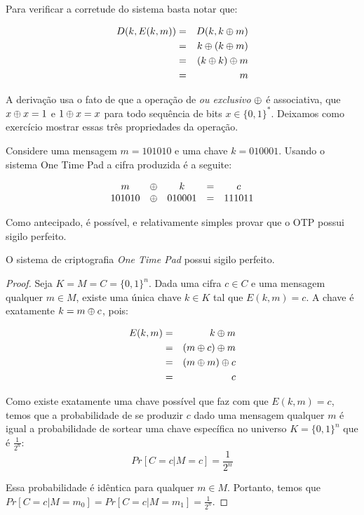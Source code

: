Para verificar a corretude do sistema basta notar que:

\begin{eqnarray*}
  D(k, E(k, m)) & = & D(k, k \oplus m)\\
                & = & k \oplus (k \oplus m)\\
                & = & (k \oplus k) \oplus m\\
                & = & m
\end{eqnarray*}

A derivação usa o fato de que a operação de {\em ou exclusivo} $\oplus$ é associativa, que $x \oplus x = 1$ e $1 \oplus x = x$ para todo sequência de bits $x \in \{0,1\}^*$.
Deixamos como exercício mostrar essas três propriedades da operação.

\begin{example}
  Considere uma mensagem $m = 101010$ e uma chave $k = 010001$.
Usando o sistema One Time Pad a cifra produzida é a seguite:

\begin{displaymath}
  \begin{array}{ccccc}
    m & \oplus & k & = & c \\
    101010 & \oplus & 010001 & = & 111011
  \end{array}
\end{displaymath}
\end{example}

Como antecipado, é possível, e relativamente simples provar que o OTP possui sigilo perfeito.

\begin{theorem}
  O sistema de criptografia {\em One Time Pad} possui sigilo perfeito.
\end{theorem}

\begin{proof}
  Seja $K = M = C = \{0,1\}^n$.
  Dada uma cifra $c \in C$ e uma mensagem qualquer $m \in M$, existe uma única chave $k \in K$ tal que $E(k,m) = c$.
  A chave é exatamente $k = m \oplus c$, pois:
  
  \begin{eqnarray*}
    E(k, m) & = & k \oplus m \\
            & = & (m \oplus c) \oplus m\\
            & = & (m \oplus m) \oplus c\\
            & = & c
  \end{eqnarray*}

Como existe exatamente uma chave possível que faz com que $E(k,m) = c$, temos que a probabilidade de se produzir $c$ dado uma mensagem qualquer $m$ é igual a probabilidade de sortear uma chave específica no universo $K = \{0,1\}^n$ que é $\frac{1}{2^n}$:
\begin{displaymath}
  Pr[C = c | M = c] = \frac{1}{2^n}
\end{displaymath}

Essa probabilidade é idêntica para qualquer $m \in M$.
Portanto, temos que $Pr[C = c| M = m_0] = Pr[C = c | M = m_1] = \frac{1}{2^n}$. 
\end{proof}

